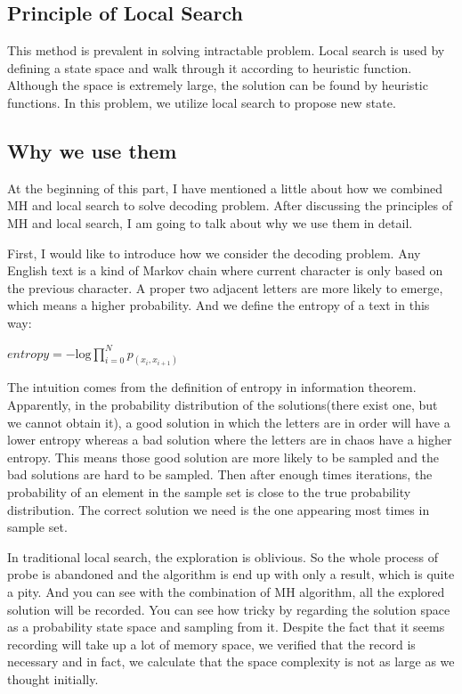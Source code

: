 \documentclass{acmtog} %
\begin{document}
\subsection{Principle of Local Search}
This method is prevalent in solving intractable problem. Local search is used by defining a state space and walk through it according to heuristic function. Although the space is extremely large, the solution can be found by heuristic functions. In this problem, we utilize local search to propose new state.
\subsection{Why we use them}
At the beginning of this part, I have mentioned a little about how we combined MH and local search to solve decoding problem. After discussing the principles of MH and local search, I am going to talk about why we use them in detail.

First, I would like to introduce how we consider the decoding problem. Any English text is a kind of Markov chain where current character is only based on the previous character. A proper two adjacent letters are more likely to emerge, which means a higher probability. And we define the entropy of a text in this way:
\begin{center}
    $entropy=-\mathrm{log}\prod _{i=0}^{N}{p}_{\left({x}_{i},{x}_{i+1}\right)}$
\end{center}
The intuition comes from the definition of entropy in information theorem. Apparently, in the probability distribution of the solutions(there exist one, but we cannot obtain it), a good solution in which the letters are in order will have a lower entropy whereas a bad solution where the letters are in chaos have a higher entropy. This means those good solution are more likely to be sampled and the bad solutions are hard to be sampled. Then after enough times iterations, the probability of an element in the sample set is close to the true probability distribution. The correct solution we need is the one appearing most times in sample set.

In traditional local search, the exploration is oblivious. So the whole process of probe is abandoned and the algorithm is end up with only a result, which is quite a pity. And you can see with the combination of MH algorithm, all the explored solution will be recorded. You can see how tricky by regarding the solution space as a probability state space and sampling from it. Despite the fact that it seems recording will take up a lot of memory space, we verified that the record is necessary and in fact, we calculate that the space complexity is not as large as we thought initially.
\end{document}
